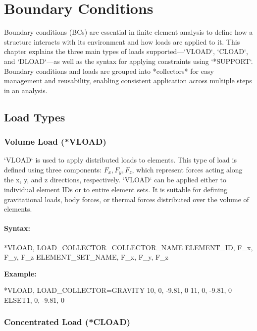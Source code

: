 \chapter{Boundary Conditions}
\label{chap:bc}

Boundary conditions (BCs) are essential in finite element analysis to define how a structure interacts with its environment and how loads are applied to it. This chapter explains the three main types of loads supported—`VLOAD`, `CLOAD`, and `DLOAD`—as well as the syntax for applying constraints using `*SUPPORT`. Boundary conditions and loads are grouped into *collectors* for easy management and reusability, enabling consistent application across multiple steps in an analysis.

\section{Load Types}

\subsection{Volume Load (*VLOAD)}

`VLOAD` is used to apply distributed loads to elements. This type of load is defined using three components: \( F_x, F_y, F_z \), which represent forces acting along the x, y, and z directions, respectively. `VLOAD` can be applied either to individual element IDs or to entire element sets. It is suitable for defining gravitational loads, body forces, or thermal forces distributed over the volume of elements.

\subsubsection{Syntax:}
\begin{codeBlock}
*VLOAD, LOAD_COLLECTOR=COLLECTOR_NAME
ELEMENT_ID, F_x, F_y, F_z
ELEMENT_SET_NAME, F_x, F_y, F_z
\end{codeBlock}

\textbf{Example:}
\begin{codeBlock}
*VLOAD, LOAD_COLLECTOR=GRAVITY
10, 0, -9.81, 0
11, 0, -9.81, 0
ELSET1, 0, -9.81, 0
\end{codeBlock}

\subsection{Concentrated Load (*CLOAD)}

